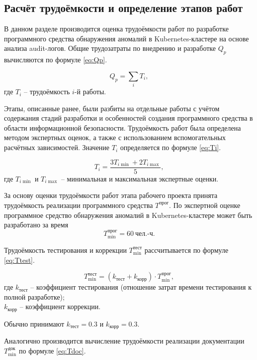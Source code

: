 \subsection{Расчёт трудоёмкости и определение этапов работ}

В данном разделе производится оценка трудоёмкости работ по разработке программного средства обнаружения аномалий в Kubernetes-кластере на основе анализа audit-логов. Общие трудозатраты по внедрению и разработке $Q_p$ вычисляются по формуле \eqref{eq:Qp}.

\begin{equation}\label{eq:Qp}
Q_p = \sum_i T_i,
\end{equation}
где $T_i$ -- трудоёмкость $i$-й работы.

Этапы, описанные ранее, были разбиты на отдельные работы с учётом содержания стадий разработки и особенностей создания программного средства в области информационной безопасности. Трудоёмкость работ была определена методом экспертных оценок, а также с использованием вспомогательных расчётных зависимостей. Значение $T_i$ определяется по формуле \eqref{eq:Ti}.

\begin{equation}\label{eq:Ti}
T_i = \frac{3T_{i\min} + 2T_{i\max}}{5},
\end{equation}
где $T_{i\min}$ и $T_{i\max}$ -- минимальная и максимальная экспертные оценки.

За основу оценки трудоёмкости работ этапа рабочего проекта принята трудоёмкость реализации программного средства $T^{\text{прог}}$. По экспертной оценке программное средство обнаружения аномалий в Kubernetes-кластере может быть разработано за время
$$
T_{\min}^{\text{прог}} = 60 \ \text{чел.-ч}.
$$

Трудоёмкость тестирования и коррекции $T_{\min}^{\text{тест}}$ рассчитывается по формуле \eqref{eq:Ttest}.

\begin{equation}
T_{\min}^{\text{тест}} = (k_{\text{тест}} + k_{\text{корр}})\cdot T_{\min}^{\text{прог}},
\label{eq:Ttest}
\end{equation}
где $k_{\text{тест}}$ -- коэффициент тестирования (отношение затрат времени тестирования к полной разработке); \\ $k_{\text{корр}}$ -- коэффициент коррекции.

Обычно принимают $k_{\text{тест}} = 0.3$ и $k_{\text{корр}} = 0.3$.

Аналогично производится вычисление трудоёмкости реализации документации $T_{\min}^{\text{док}}$ по формуле \eqref{eq:Tdoc}.

